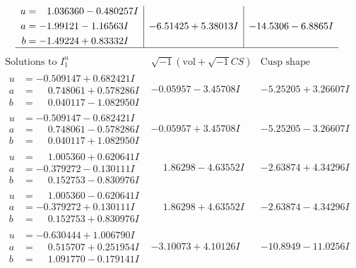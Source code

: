 \documentclass[1p]{elsarticle_modified}
\theoremstyle{definition}
\newcommand{\I}{\sqrt{-1}}
\begin{document}
$$\begin{array}{c|c|c}
\begin{aligned}
u &= \phantom{-}1.036360 - 0.480257 I \\
a &= -1.99121 - 1.16563 I \\
b &= -1.49224 + 0.83332 I\end{aligned}
 & -6.51425 + 5.38013 I & -14.5306 - 6.8865 I\\
 \hline 
 \end{array}$$\newpage$$\begin{array}{c|c|c}  
\text{Solutions to }I^u_{1}& \I (\text{vol} + \sqrt{-1}CS) & \text{Cusp shape}\\
 \hline 
\begin{aligned}
u &= -0.509147 + 0.682421 I \\
a &= \phantom{-}0.748061 + 0.578286 I \\
b &= \phantom{-}0.040117 - 1.082950 I\end{aligned}
 & -0.05957 - 3.45708 I & -5.25205 + 3.26607 I \\ \hline\begin{aligned}
u &= -0.509147 - 0.682421 I \\
a &= \phantom{-}0.748061 - 0.578286 I \\
b &= \phantom{-}0.040117 + 1.082950 I\end{aligned}
 & -0.05957 + 3.45708 I & -5.25205 - 3.26607 I \\ \hline\begin{aligned}
u &= \phantom{-}1.005360 + 0.620641 I \\
a &= -0.379272 - 0.130111 I \\
b &= \phantom{-}0.152753 - 0.830976 I\end{aligned}
 & \phantom{-}1.86298 - 4.63552 I & -2.63874 + 4.34296 I \\ \hline\begin{aligned}
u &= \phantom{-}1.005360 - 0.620641 I \\
a &= -0.379272 + 0.130111 I \\
b &= \phantom{-}0.152753 + 0.830976 I\end{aligned}
 & \phantom{-}1.86298 + 4.63552 I & -2.63874 - 4.34296 I \\ \hline\begin{aligned}
u &= -0.630444 + 1.006790 I \\
a &= \phantom{-}0.515707 + 0.251954 I \\
b &= \phantom{-}1.091770 - 0.179141 I\end{aligned}
 & -3.10073 + 4.10126 I & -10.8949 - 11.0256 I \\ \hline\begin{aligned}

\end{aligned}
\end{array}$$
\end{document}
